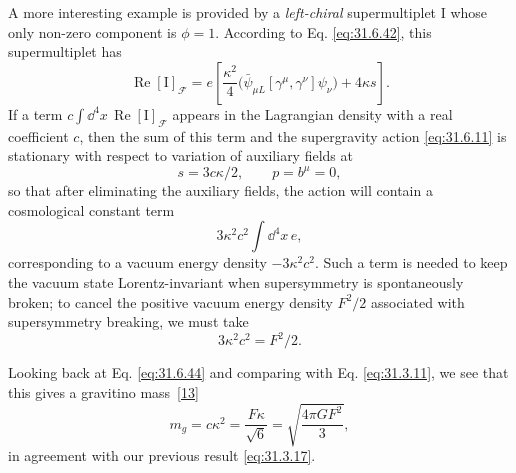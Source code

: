 A more interesting example is provided by a \emph{left-chiral}
supermultiplet \(\mathrm I\) whose only non-zero component is \(\phi=1\).
According to Eq. \eqref{eq:31.6.42}, this supermultiplet has
\begin{equation}
  \operatorname{Re}[\mathrm I]_{\mathcal F}
  =e\left[
    \frac{\kappa^2}{4}
      \bigl(\bar\psi_{\mu L}[\gamma^\mu,\gamma^\nu]\psi_\nu\bigr)
    +4\kappa s
  \right].
  \tag{31.6.44}\label{eq:31.6.44}
\end{equation}
If a term \(c\int \dd^4x\,\operatorname{Re}[\mathrm I]_{\mathcal F}\)
appears in the Lagrangian density with a real coefficient \(c\), then
the sum of this term and the supergravity action \eqref{eq:31.6.11} is
stationary with respect to variation of auxiliary fields at
\begin{equation}
  s=3c\kappa/2,\qquad p=b^\mu=0,
  \tag{31.6.45}\label{eq:31.6.45}
\end{equation}
so that after eliminating the auxiliary fields, the action will contain
a cosmological constant term
\begin{equation}
  3\kappa^2c^2\int \dd^4x\,e,
  \tag{31.6.46}\label{eq:31.6.46}
\end{equation}
corresponding to a vacuum energy density \(-3\kappa^2c^2\). Such a term
is needed to keep the vacuum state Lorentz-invariant when supersymmetry
is spontaneously broken; to cancel the positive vacuum energy density
\(F^2/2\) associated with supersymmetry breaking, we must take
\begin{equation}
  3\kappa^2c^2=F^2/2.
  \tag{31.6.47}\label{eq:31.6.47}
\end{equation}

Looking back at Eq. \eqref{eq:31.6.44} and comparing with
Eq. \eqref{eq:31.3.11}, we see that this gives a gravitino
mass~\hyperref[ch31-ref-13]{[13]}
\begin{equation}
  m_g=c\kappa^2
  =\frac{F\kappa}{\sqrt{6}}
  =\sqrt{\frac{4\pi G F^2}{3}},
  \tag{31.6.48}\label{eq:31.6.48}
\end{equation}
in agreement with our previous result \eqref{eq:31.3.17}.

